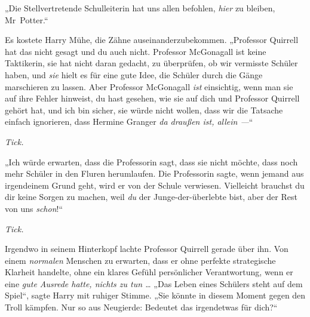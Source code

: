 „Die Stellvertretende Schulleiterin hat uns allen befohlen, \emph{hier} zu bleiben, Mr~Potter.“

Es kostete Harry Mühe, die Zähne auseinanderzubekommen.
„Professor Quirrell hat das nicht gesagt und du auch nicht. Professor McGonagall ist keine Taktikerin, sie hat nicht daran gedacht, zu überprüfen, ob wir vermisste Schüler haben, und \emph{sie} hielt es für eine gute Idee, die Schüler durch die Gänge marschieren zu lassen. Aber Professor McGonagall \emph{ist} einsichtig, wenn man sie auf ihre Fehler hinweist, du hast gesehen, wie sie auf dich und Professor Quirrell gehört hat, und ich bin sicher, sie würde nicht wollen, dass wir die Tatsache einfach ignorieren, dass Hermine Granger \emph{da draußen ist, allein —}“

\emph{Tick.}

„Ich würde erwarten, dass die Professorin sagt, dass sie nicht möchte, dass noch mehr Schüler in den Fluren herumlaufen. Die Professorin sagte, wenn jemand aus irgendeinem Grund geht, wird er von der Schule verwiesen. Vielleicht brauchst du dir keine Sorgen zu machen, weil \emph{du} der Junge-der-überlebte bist, aber der Rest von uns \emph{schon}!“

\emph{Tick.}

Irgendwo in seinem Hinterkopf lachte Professor Quirrell gerade über ihn. Von einem \emph{normalen} Menschen zu erwarten, dass er ohne perfekte strategische Klarheit handelte, ohne ein klares Gefühl persönlicher Verantwortung, wenn er eine \emph{gute Ausrede hatte, nichts zu tun …}
„Das Leben eines Schülers steht auf dem Spiel“, sagte Harry mit ruhiger Stimme.
„Sie könnte in diesem Moment gegen den Troll kämpfen. Nur so aus Neugierde: Bedeutet das irgendetwas für dich?“

